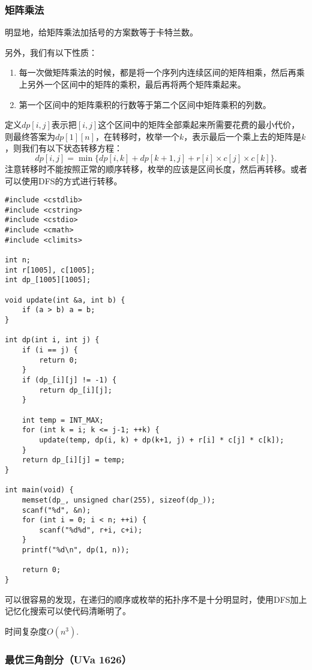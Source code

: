 \subsubsection{矩阵乘法}
明显地，给矩阵乘法加括号的方案数等于卡特兰数。

另外，我们有以下性质：
\begin{enumerate}
    \item{每一次做矩阵乘法的时候，都是将一个序列内连续区间的矩阵相乘，然后再乘上另外一个区间中的矩阵的乘积，最后再将两个矩阵乘起来。}
    \item{第一个区间中的矩阵乘积的行数等于第二个区间中矩阵乘积的列数。}
\end{enumerate}

定义$dp[i,j]$表示把$[i,j]$这个区间中的矩阵全部乘起来所需要花费的最小代价，则最终答案为$dp[1][n]$，在转移时，枚举一个$k$，表示最后一个乘上去的矩阵是$k$，则我们有以下状态转移方程：
\begin{equation*}
    dp[i,j]=\min\{dp[i,k]+dp[k+1,j]+r[i]\times c[j]\times c[k]\}.
\end{equation*}
注意转移时不能按照正常的顺序转移，枚举的应该是区间长度，然后再转移。或者可以使用DFS的方式进行转移。
\begin{verbatim}
#include <cstdlib>
#include <cstring>
#include <cstdio>
#include <cmath>
#include <climits>

int n;
int r[1005], c[1005];
int dp_[1005][1005];

void update(int &a, int b) {
    if (a > b) a = b;
}

int dp(int i, int j) {
    if (i == j) {
        return 0;
    }
    if (dp_[i][j] != -1) {
        return dp_[i][j];
    }

    int temp = INT_MAX;
    for (int k = i; k <= j-1; ++k) {
        update(temp, dp(i, k) + dp(k+1, j) + r[i] * c[j] * c[k]);
    }
    return dp_[i][j] = temp;
}

int main(void) {
    memset(dp_, unsigned char(255), sizeof(dp_));
    scanf("%d", &n);
    for (int i = 0; i < n; ++i) {
        scanf("%d%d", r+i, c+i);
    }
    printf("%d\n", dp(1, n));

    return 0;
}
\end{verbatim}

可以很容易的发现，在递归的顺序或枚举的拓扑序不是十分明显时，使用DFS加上记忆化搜索可以使代码清晰明了。

时间复杂度$O(n^3)$.
\subsubsection{最优三角剖分（UVa 1626）}

